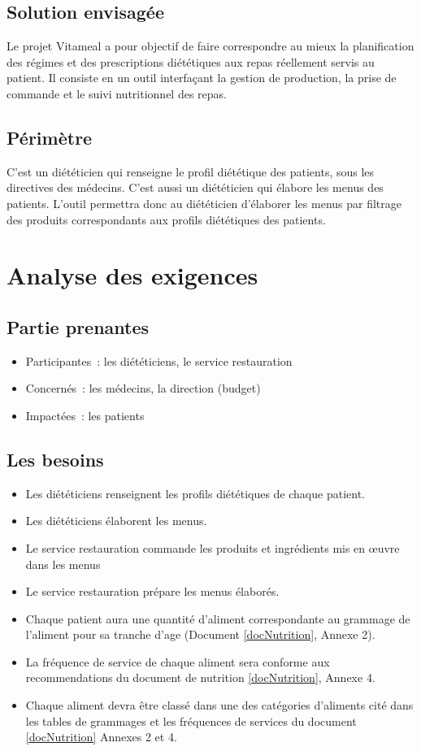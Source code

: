 \subsection{Solution envisagée}
Le projet Vitameal a pour objectif de faire correspondre au mieux la planification des régimes et des
prescriptions diététiques aux repas réellement servis au patient. Il consiste en un outil interfaçant la
gestion de production, la prise de commande et le suivi nutritionnel des repas.

\subsection{Périmètre}
C'est un diététicien qui renseigne le profil diététique des patients,
sous les directives des médecins. C'est aussi un diététicien qui élabore
les menus des patients. L'outil permettra donc au diététicien d'élaborer
les menus par filtrage des produits correspondants aux profils
diététiques des patients.

\section{Analyse des exigences}
\subsection{Partie prenantes}
\begin{itemize}
\item Participantes~: les diététiciens, le service restauration
\item Concernés~: les médecins, la direction (budget)
\item Impactées~: les patients
\end{itemize}

\subsection{Les besoins}
\begin{itemize}
\item Les diététiciens renseignent les profils diététiques de chaque patient.
\item Les diététiciens élaborent les menus.
\item Le service restauration commande les produits et ingrédients mis en œuvre dans les menus
\item Le service restauration prépare les menus élaborés.
\item Chaque patient aura une quantité d'aliment correspondante au grammage de l'aliment pour sa tranche d'age (Document \ref{docNutrition}, Annexe 2).
\item La fréquence de service de chaque aliment sera conforme aux recommendations du document de nutrition \ref{docNutrition}, Annexe 4.
\item Chaque aliment devra être classé dans une des catégories d'aliments cité dans les tables de grammages et les fréquences de services du document \ref{docNutrition} Annexes 2 et 4.
\end{itemize}

